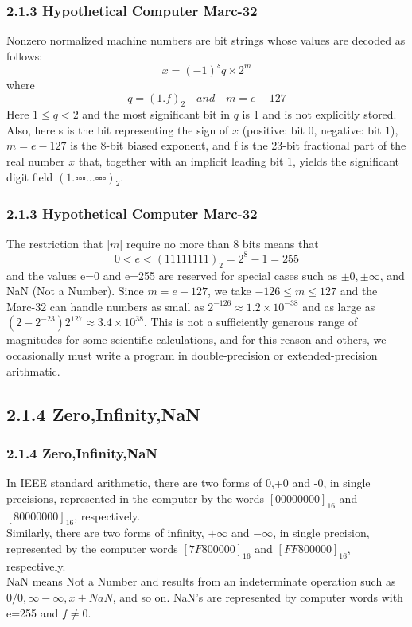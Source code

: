 \documentclass[notheorems,mathserif,table,compress]{beamer}  %
\begin{document}
\begin{frame}
  \frametitle{2.1.3 Hypothetical Computer Marc-32}
  Nonzero normalized machine numbers are bit strings whose values are decoded as follows:
  \begin{displaymath}
  x=(-1)^s q \times 2^m
  \end{displaymath}
  where
  \begin{displaymath}
  q=(1.f)_2 \quad and \quad m=e-127
  \end{displaymath}
  Here $1 \le q < 2$ and the most significant bit in $q$ is 1 and is not explicitly stored. Also, here s is the bit representing the sign of $x$ (positive: bit 0, negative: bit 1), $m=e-127$ is the 8-bit biased exponent, and f is the 23-bit fractional part of the real number $x$ that, together with an implicit leading bit 1, yields the significant digit field $(1.\square \square \square \ldots \square \square \square)_2$. 
\end{frame}


\begin{frame}
  \frametitle{2.1.3 Hypothetical Computer Marc-32}
  The restriction that $|m|$ require no more than 8 bits means that 
  \begin{displaymath}
  0<e<(11111111)_2=2^8-1=255
  \end{displaymath}
  and the values e=0 and e=255 are reserved for special cases such as $\pm0,\pm \infty$, and NaN (Not a Number). Since $m=e-127$, we take    $-126 \le m \le 127$ and the Marc-32 can handle numbers as small as $2^{-126} \approx 1.2 \times 10^{-38}$ and as large as $(2-2^{-23})2^{127} \approx 3.4 \times 10^{38}$. This is not a sufficiently generous range of magnitudes for some scientific calculations, and for this reason and others, we occasionally must write a program in \textsf{double-precision} or \textsf{extended-precision arithmatic}.
\end{frame}


\subsection{2.1.4 Zero,Infinity,NaN}

\begin{frame}
  \frametitle{2.1.4 Zero,Infinity,NaN}
In IEEE standard arithmetic, there are two forms of 0,+0 and -0, in single precisions, represented in the computer by the words $[00000000]_{16}$ and $[80000000]_{16}$, respectively.\\
Similarly, there are two forms of infinity, $+\infty$ and $-\infty$, in single precision, represented by the computer words $[7F800000]_{16}$ and $[FF800000]_{16}$, respectively.\\
NaN means Not a Number and results from an indeterminate operation such as $0/0, \infty - \infty, x+NaN$, and so on. NaN's are represented by computer words with e=255 and $f \ne 0$.
\end{frame}
\end{document}
